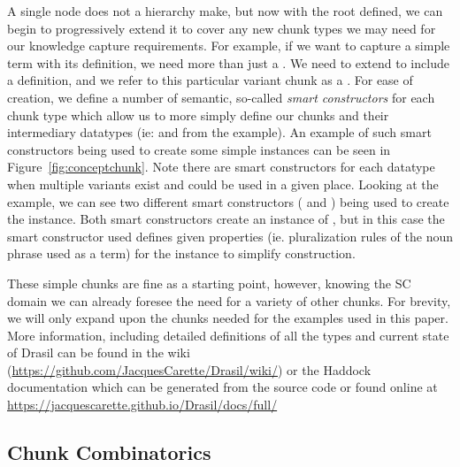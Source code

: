 A single node does not a hierarchy make, but now with the root 
 defined, we can begin to progressively extend it to cover 
any new chunk types we may need for our knowledge capture requirements. For 
example, if we want to capture a simple term with its definition, we need more 
than just a . We need to extend  to include 
a definition, and we refer to this particular variant chunk as a 
. For ease of creation, we define a number of semantic, 
so-called \emph{smart constructors} for each chunk type which allow us to more 
simply define our chunks and their intermediary datatypes (ie:  and 
 from the  example). An example of such smart 
constructors being used to create some simple  instances 
can be seen in Figure~\ref{fig:conceptchunk}. Note there are smart constructors 
for each datatype when multiple variants exist and could be used in a given 
place. Looking at the  example, we can see two different 
smart constructors ( and ) being used to create the 
 instance. Both smart constructors create an instance of , 
but in this case the smart constructor used defines given properties (ie. 
pluralization rules of the noun phrase used as a term) for the instance to 
simplify construction.


These simple chunks are fine as a starting point, however, knowing the SC 
domain we can already foresee the need for a variety of other chunks. For 
brevity, we will only expand upon the chunks needed for the examples used in 
this paper. More information, including detailed definitions of all the types 
and current state of Drasil can be found in the wiki 
(\href{https://github.com/JacquesCarette/Drasil/wiki/}
{https://github.com/JacquesCarette/Drasil/wiki/}) or the Haddock documentation 
which can be generated from the source code or found online at 
\href{https://jacquescarette.github.io/Drasil/docs/full/}
{https://jacquescarette.github.io/Drasil/docs/full/}

\subsection{Chunk Combinatorics}
\label{sec:chunky}

